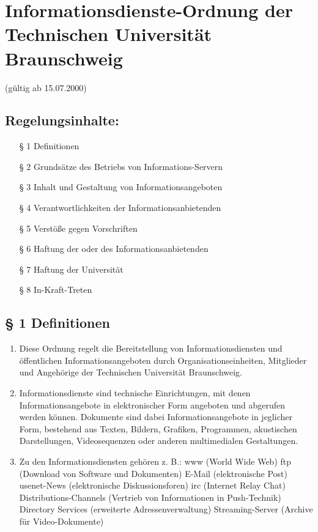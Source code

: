 \section{Informationsdienste-Ordnung der
Technischen Universität Braunschweig}
\label{info-richtlinien}
\small{(gültig ab 15.07.2000)}
\subsection*{Regelungsinhalte:}
\renewcommand{\labelenumi}{(\theenumi)} 
\begin{itemize}
\item[§ 1]	Definitionen
\item[§ 2]	Grundsätze des Betriebs von Informations-Servern
\item[§ 3]	Inhalt und Gestaltung von Informationsangeboten
\item[§ 4]	Verantwortlichkeiten der Informationsanbietenden
\item[§ 5]	Verstöße gegen Vorschriften
\item[§ 6]	Haftung der oder des Informationsanbietenden
\item[§ 7]	Haftung der Universität
\item[§ 8]	In-Kraft-Treten
\end{itemize}

\subsection*{§ 1 Definitionen}
\begin{enumerate}
\item Diese Ordnung regelt die Bereitstellung von Informationsdiensten und öffentlichen Informationsangeboten durch Organisationseinheiten, Mitglieder und Angehörige der Technischen Universität Braunschweig. 
\item Informationsdienste sind technische Einrichtungen, mit denen Informationsangebote in elektronischer Form angeboten und abgerufen werden können. Dokumente sind dabei Informationsangebote in jeglicher Form, bestehend aus Texten, Bildern, Grafiken, Programmen, akustischen Darstellungen, Videosequenzen oder anderen multimedialen Gestaltungen.
\item Zu den Informationsdiensten gehören z. B.: 
www (World Wide Web) 
ftp (Download von Software und Dokumenten) 
E-Mail (elektronische Post) 
usenet-News (elektronische Diskussionsforen) 
irc (Internet Relay Chat) 
Distributions-Channels (Vertrieb von Informationen in Push-Technik) 
Directory Services (erweiterte Adressenverwaltung) 
Streaming-Server (Archive für Video-Dokumente)
\end{enumerate}
